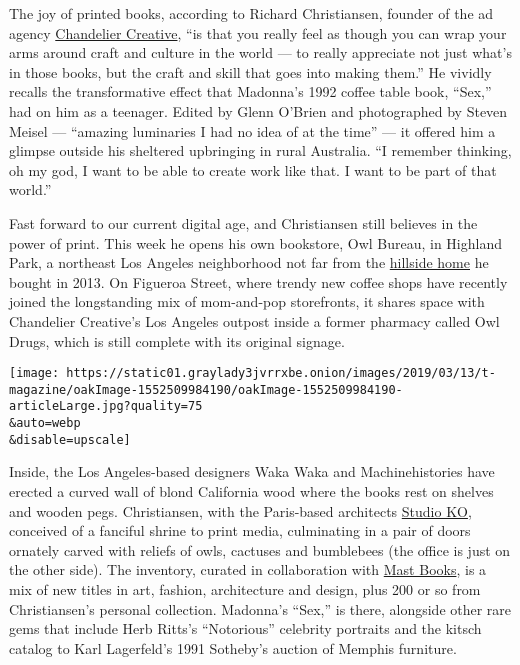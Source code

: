 The joy of printed books, according to Richard Christiansen, founder of
the ad agency \href{https://www.chandeliercreative.com/}{Chandelier
Creative}, ``is that you really feel as though you can wrap your arms
around craft and culture in the world --- to really appreciate not just
what's in those books, but the craft and skill that goes into making
them.'' He vividly recalls the transformative effect that Madonna's 1992
coffee table book, ``Sex,'' had on him as a teenager. Edited by Glenn
O'Brien and photographed by Steven Meisel --- ``amazing luminaries I had
no idea of at the time'' --- it offered him a glimpse outside his
sheltered upbringing in rural Australia. ``I remember thinking, oh my
god, I want to be able to create work like that. I want to be part of
that world.''

Fast forward to our current digital age, and Christiansen still believes
in the power of print. This week he opens his own bookstore, Owl Bureau,
in Highland Park, a northeast Los Angeles neighborhood not far from the
\href{https://www.nytimes3xbfgragh.onion/2018/09/14/t-magazine/los-angeles-dream-house-flamingo-estate.html}{hillside
home} he bought in 2013. On Figueroa Street, where trendy new coffee
shops have recently joined the longstanding mix of mom-and-pop
storefronts, it shares space with Chandelier Creative's Los Angeles
outpost inside a former pharmacy called Owl Drugs, which is still
complete with its original signage.

\texttt{[image: https://static01.graylady3jvrrxbe.onion/images/2019/03/13/t-magazine/oakImage-1552509984190/oakImage-1552509984190-articleLarge.jpg?quality=75\\\&auto=webp\\\&disable=upscale]}

Inside, the Los Angeles-based designers Waka Waka and Machinehistories
have erected a curved wall of blond California wood where the books rest
on shelves and wooden pegs. Christiansen, with the Paris-based
architects
\href{https://www.nytimes3xbfgragh.onion/2015/09/23/t-magazine/minimalism-design-studio-ko.html}{Studio
KO}, conceived of a fanciful shrine to print media, culminating in a
pair of doors ornately carved with reliefs of owls, cactuses and
bumblebees (the office is just on the other side). The inventory,
curated in collaboration with \href{https://www.mastbooks.com/}{Mast
Books}, is a mix of new titles in art, fashion, architecture and design,
plus 200 or so from Christiansen's personal collection. Madonna's
``Sex,'' is there, alongside other rare gems that include Herb Ritts's
``Notorious'' celebrity portraits and the kitsch catalog to Karl
Lagerfeld's 1991 Sotheby's auction of Memphis furniture.

